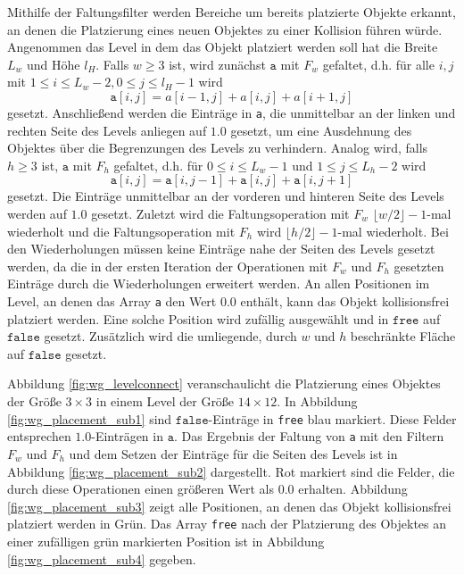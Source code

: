Mithilfe der Faltungsfilter werden Bereiche um bereits platzierte Objekte erkannt, an denen die Platzierung eines neuen Objektes zu einer Kollision führen würde. Angenommen das Level in dem das Objekt platziert werden soll hat die Breite $L_w$ und Höhe $l_H$. Falls $w\ge 3$ ist, wird zunächst $\texttt{a}$ mit $F_w$ gefaltet, d.h. für alle $i,j$ mit $1 \le i \le L_w-2, 0\le j\le l_H - 1$ wird \[\texttt{a}[i,j] = a[i-1,j] +  a[i,j] + a[i+1,j]\] gesetzt. Anschließend werden die Einträge in \texttt{a}, die unmittelbar an der linken und rechten Seite des Levels anliegen auf $1.0$ gesetzt, um eine Ausdehnung des Objektes über die Begrenzungen des Levels zu verhindern. Analog wird, falls $h\ge 3$ ist, $\texttt{a}$ mit $F_h$ gefaltet, d.h. für $0\le i\le L_w-1$ und $1\le j\le L_h-2$ wird \[\texttt{a}[i,j] = \texttt{a}[i,j-1] + \texttt{a}[i,j] + \texttt{a}[i,j+1]\] gesetzt. Die Einträge unmittelbar an der vorderen und hinteren Seite des Levels werden auf $1.0$ gesetzt. Zuletzt wird die Faltungsoperation mit $F_w$ $\lfloor w/2\rfloor-1$-mal wiederholt und die Faltungsoperation mit $F_h$ wird $\lfloor h/2\rfloor-1$-mal wiederholt. Bei den Wiederholungen müssen keine Einträge nahe der Seiten des Levels gesetzt werden, da die in der ersten Iteration der Operationen mit $F_w$ und $F_h$ gesetzten Einträge durch die Wiederholungen erweitert werden. An allen Positionen im Level, an denen das Array  \texttt{a} den Wert $0.0$ enthält, kann das Objekt kollisionsfrei platziert werden. Eine solche Position wird zufällig ausgewählt und in $\texttt{free}$ auf $\texttt{false}$ gesetzt. Zusätzlich wird die umliegende, durch $w$ und $h$ beschränkte Fläche auf $\texttt{false}$ gesetzt.

Abbildung \ref{fig:wg_levelconnect} veranschaulicht die Platzierung eines Objektes der Größe $3\times 3$ in einem Level der Größe $14\times 12$. In Abbildung \ref{fig:wg_placement_sub1} sind $\texttt{false}$-Einträge in \texttt{free} blau markiert. Diese Felder entsprechen $1.0$-Einträgen in $\texttt{a}$. Das Ergebnis der Faltung von \texttt{a} mit den Filtern $F_w$ und $F_h$ und dem Setzen der Einträge für die Seiten des Levels ist in Abbildung \ref{fig:wg_placement_sub2} dargestellt. Rot markiert sind die Felder, die durch diese Operationen einen größeren Wert als $0.0$ erhalten. Abbildung \ref{fig:wg_placement_sub3} zeigt alle Positionen, an denen das Objekt kollisionsfrei platziert werden in Grün. Das Array \texttt{free} nach der Platzierung des Objektes an einer zufälligen grün markierten Position ist in Abbildung \ref{fig:wg_placement_sub4} gegeben.


